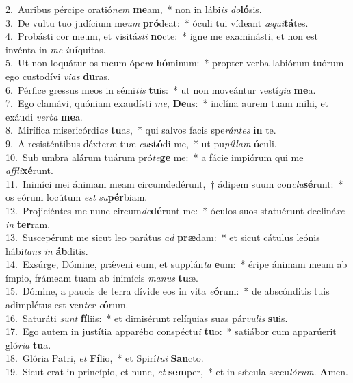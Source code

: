{2.~}Auribus pércipe oratió\textit{nem} \textbf{me}am,~* non in lábi\textit{is} \textit{do}\textbf{ló}sis.\\
{3.~}De vultu tuo judícium me\textit{um} \textbf{pró}deat:~* óculi tui vídeant \textit{æ}\textit{qui}\textbf{tá}tes.\\
{4.~}Probásti cor meum, et visitá\textit{sti} \textbf{no}cte:~* igne me examinásti, et non est invénta in \textit{me} \textit{i}\textbf{ní}quitas.\\
{5.~}Ut non loquátur os meum ópe\textit{ra} \textbf{hó}minum:~* propter verba labiórum tuórum ego custodívi \textit{vi}\textit{as} \textbf{du}ras.\\
{6.~}Pérfice gressus meos in sémi\textit{tis} \textbf{tu}is:~* ut non moveántur vestí\textit{gi}\textit{a} \textbf{me}a.\\
{7.~}Ego clamávi, quóniam exaudísti \textit{me}, \textbf{De}us:~* inclína aurem tuam mihi, et exáudi \textit{ver}\textit{ba} \textbf{me}a.\\
{8.~}Mirífica misericórdi\textit{as} \textbf{tu}as,~* qui salvos facis spe\textit{rán}\textit{tes} \textbf{in} te.\\
{9.~}A resisténtibus déxteræ tuæ \textit{cu}\textbf{stó}di me,~* ut pu\textit{píl}\textit{lam} \textbf{ó}culi.\\
{10.~}Sub umbra alárum tuárum pró\textit{te}\textbf{ge} me:~* a fácie impiórum qui me \textit{af}\textit{fli}\textbf{xé}runt.\\
{11.~}Inimíci mei ánimam meam circumdedérunt,~† ádipem suum con\textit{clu}\textbf{sé}runt:~* os eórum locútum \textit{est} \textit{su}\textbf{pér}biam.\\
{12.~}Projiciéntes me nunc circum\textit{de}\textbf{dé}runt me:~* óculos suos statuérunt decliná\textit{re} \textit{in} \textbf{ter}ram.\\
{13.~}Suscepérunt me sicut leo parátus \textit{ad} \textbf{præ}dam:~* et sicut cátulus leónis hábi\textit{tans} \textit{in} \textbf{áb}ditis.\\
{14.~}Exsúrge, Dómine, prǽveni eum, et supplán\textit{ta} \textbf{e}um:~* éripe ánimam meam ab ímpio, frámeam tuam ab inimícis \textit{ma}\textit{nus} \textbf{tu}æ.\\
{15.~}Dómine, a paucis de terra dívide eos in vita \textit{e}\textbf{ó}rum:~* de abscónditis tuis adimplétus est ven\textit{ter} \textit{e}\textbf{ó}rum.\\
{16.~}Saturáti \textit{sunt} \textbf{fí}liis:~* et dimisérunt relíquias suas pár\textit{vu}\textit{lis} \textbf{su}is.\\
{17.~}Ego autem in justítia apparébo conspéctu\textit{i} \textbf{tu}o:~* satiábor cum apparúerit gló\textit{ri}\textit{a} \textbf{tu}a.\\
{18.~}Glória Patri, \textit{et} \textbf{Fí}lio,~* et Spirí\textit{tu}\textit{i} \textbf{San}cto.\\
{19.~}Sicut erat in princípio, et nunc, \textit{et} \textbf{sem}per,~* et in sǽcula sæcu\textit{ló}\textit{rum}. \textbf{A}men.\\
